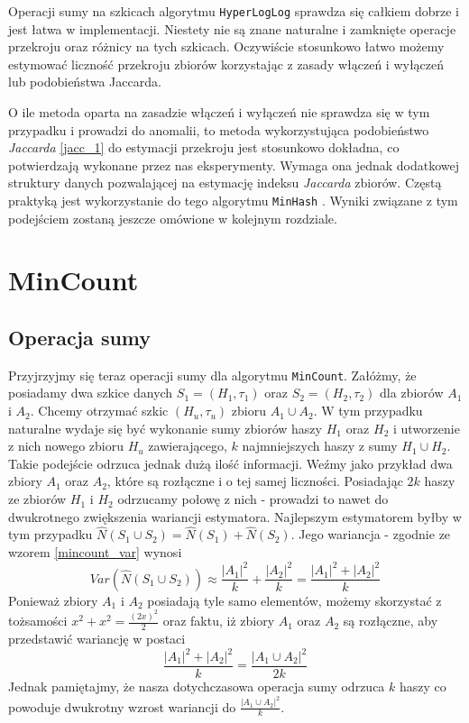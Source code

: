Operacji sumy na szkicach algorytmu \texttt{HyperLogLog} sprawdza się całkiem dobrze i jest  łatwa w implementacji. Niestety nie są znane naturalne i zamknięte operacje przekroju oraz różnicy na tych szkicach. Oczywiście stosunkowo łatwo możemy estymować liczność przekroju zbiorów korzystając z zasady włączeń i wyłączeń lub podobieństwa Jaccarda.

O ile metoda oparta na zasadzie włączeń i wyłączeń nie sprawdza się w tym przypadku i prowadzi do anomalii, to metoda wykorzystująca podobieństwo \textit{Jaccarda} \ref{jacc_1} do estymacji przekroju jest stosunkowo dokładna, co potwierdzają wykonane przez nas eksperymenty. Wymaga ona jednak dodatkowej struktury danych pozwalającej na estymację indeksu \textit{Jaccarda} zbiorów. Częstą praktyką jest wykorzystanie do tego algorytmu \texttt{MinHash} \cite{adroll}. Wyniki związane z tym podejściem zostaną jeszcze omówione w kolejnym rozdziale.


\section{MinCount}

\subsection{Operacja sumy}
\label{impr_sum}

Przyjrzyjmy się teraz operacji sumy dla algorytmu \texttt{MinCount}. Załóżmy, że posiadamy dwa szkice danych $S_1 = (H_1, {\tau}_1)$ oraz $S_2 = (H_2, {\tau}_2)$ dla zbiorów $A_1$ i $A_2$. Chcemy otrzymać szkic $(H_u, {\tau}_u)$ zbioru $A_1 \cup A_2$. W tym przypadku naturalne wydaje się być wykonanie sumy zbiorów haszy $H_1$ oraz $H_2$ i utworzenie z nich nowego zbioru $H_u$ zawierającego, $k$ najmniejszych haszy z sumy $H_1 \cup H_2$. Takie podejście  odrzuca jednak dużą ilość informacji. Weźmy jako przykład dwa zbiory $A_1$ oraz $A_2$, które są rozłączne i o tej samej liczności.
Posiadając $2k$ haszy ze zbiorów $H_1$ i $H_2$ odrzucamy połowę z nich - prowadzi to nawet do dwukrotnego zwiększenia wariancji estymatora. 
 Najlepszym estymatorem byłby w tym przypadku $\hat{N}(S_1 \cup S_2) = \hat{N}(S_1) + \hat{N}(S_2)$. Jego wariancja - zgodnie ze wzorem \ref{mincount_var} wynosi $$Var(\hat{N}(S_1 \cup S_2)) \approx \frac{|A_1|^2}{k} + \frac{|A_2|^2}{k} = \frac{|A_1|^2 + |A_2|^2}{k}$$ Ponieważ zbiory $A_1$ i $A_2$ posiadają tyle samo elementów, możemy skorzystać z tożsamości $x^2 + x^2  = \frac{(2x)^2}{2}$ oraz faktu, iż zbiory $A_1$ oraz $A_2$ są rozłączne, aby przedstawić wariancję w postaci $$\frac{|A_1|^2 + |A_2|^2}{k} = \frac{|A_1 \cup A_2|^2}{2k}$$ Jednak pamiętajmy, że nasza dotychczasowa operacja sumy odrzuca $k$ haszy co powoduje dwukrotny wzrost wariancji do $\frac{|A_1 \cup A_2|^2}{k}$.

